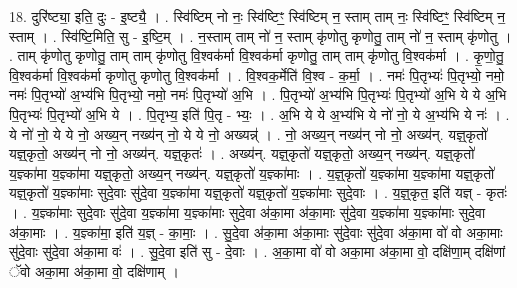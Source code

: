 \documentclass[17pt]{extarticle}
\begin{document}
18. दुरि॑ष्ट्या॒ इति॒ दुः - इ॒ष्ट्यै॒ । . स्वि॑ष्टिम् नो नः॒ स्वि॑ष्टिꣳ॒॒ स्वि॑ष्टिम् न॒ स्ताम् ताम् नः॒ स्वि॑ष्टिꣳ॒॒ स्वि॑ष्टिम् न॒ स्ताम् । . स्वि॑ष्टि॒मिति॒ सु - इ॒ष्टि॒म् । . न॒स्ताम् ताम् नो॑ न॒ स्ताम् कृ॑णोतु कृणोतु॒ ताम् नो॑ न॒ स्ताम् कृ॑णोतु । . ताम् कृ॑णोतु कृणोतु॒ ताम् ताम् कृ॑णोतु वि॒श्वक॑र्मा वि॒श्वक॑र्मा कृणोतु॒ ताम् ताम् कृ॑णोतु वि॒श्वक॑र्मा । . कृ॒णो॒तु॒ वि॒श्वक॑र्मा वि॒श्वक॑र्मा कृणोतु कृणोतु वि॒श्वक॑र्मा । . वि॒श्वक॒र्मेति॑ वि॒श्व - क॒र्मा॒ । . नमः॑ पि॒तृभ्यः॑ पि॒तृभ्यो॒ नमो॒ नमः॑ पि॒तृभ्यो॑ अ॒भ्य॑भि पि॒तृभ्यो॒ नमो॒ नमः॑ पि॒तृभ्यो॑ अ॒भि । . पि॒तृभ्यो॑ अ॒भ्य॑भि पि॒तृभ्यः॑ पि॒तृभ्यो॑ अ॒भि ये ये अ॒भि पि॒तृभ्यः॑ पि॒तृभ्यो॑ अ॒भि ये । . पि॒तृभ्य॒ इति॑ पि॒तृ - भ्यः॒ । . अ॒भि ये ये अ॒भ्य॑भि ये नो॑ नो॒ ये अ॒भ्य॑भि ये नः॑ । . ये नो॑ नो॒ ये ये नो॒ अख्य॒न् नख्य॑न् नो॒ ये ये नो॒ अख्यन्न्॑ । . नो॒ अख्य॒न् नख्य॑न् नो नो॒ अख्य॑न्. यज्ञ्॒कृतो॑ यज्ञ्॒कृतो॒ अख्य॑न् नो नो॒ अख्य॑न्. यज्ञ्॒कृतः॑ । . अख्य॑न्. यज्ञ्॒कृतो॑ यज्ञ्॒कृतो॒ अख्य॒न् नख्य॑न्. यज्ञ्॒कृतो॑ य॒ज्ञ्का॑मा य॒ज्ञ्का॑मा यज्ञ्॒कृतो॒ अख्य॒न् नख्य॑न्. यज्ञ्॒कृतो॑ य॒ज्ञ्का॑माः । . य॒ज्ञ्॒कृतो॑ य॒ज्ञ्का॑मा य॒ज्ञ्का॑मा यज्ञ्॒कृतो॑ यज्ञ्॒कृतो॑ य॒ज्ञ्का॑माः सुदे॒वाः सु॑दे॒वा य॒ज्ञ्का॑मा यज्ञ्॒कृतो॑ यज्ञ्॒कृतो॑ य॒ज्ञ्का॑माः सुदे॒वाः । . य॒ज्ञ्॒कृत॒ इति॑ यज्ञ् - कृतः॑ । . य॒ज्ञ्का॑माः सुदे॒वाः सु॑दे॒वा य॒ज्ञ्का॑मा य॒ज्ञ्का॑माः सुदे॒वा अ॑का॒मा अ॑का॒माः सु॑दे॒वा य॒ज्ञ्का॑मा य॒ज्ञ्का॑माः सुदे॒वा अ॑का॒माः । . य॒ज्ञ्का॑मा॒ इति॑ य॒ज्ञ् - का॒माः॒ । . सु॒दे॒वा अ॑का॒मा अ॑का॒माः सु॑दे॒वाः सु॑दे॒वा अ॑का॒मा वो॑ वो अका॒माः सु॑दे॒वाः सु॑दे॒वा अ॑का॒मा वः॑ । . सु॒दे॒वा इति॑ सु - दे॒वाः । . अ॒का॒मा वो॑ वो अका॒मा अ॑का॒मा वो॒ दक्षि॑णा॒म् दक्षि॑णां ॅवो अका॒मा अ॑का॒मा वो॒ दक्षि॑णाम् । \newline
\end{document}
